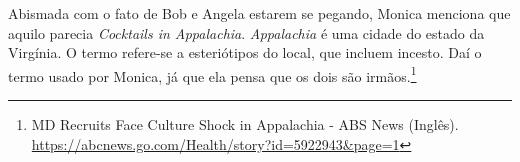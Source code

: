 Abismada com o fato de Bob e Angela estarem se pegando, Monica menciona
que aquilo parecia \emph{Cocktails in Appalachia}. \emph{Appalachia} é
uma cidade do estado da Virgínia. O termo refere-se a esteriótipos do
local, que incluem incesto. Daí o termo usado por Monica, já que ela
pensa que os dois são irmãos.\footnote{\sloppy MD Recruits Face Culture Shock in Appalachia - ABS News (Inglês). \url{https://abcnews.go.com/Health/story?id=5922943&page=1}}
